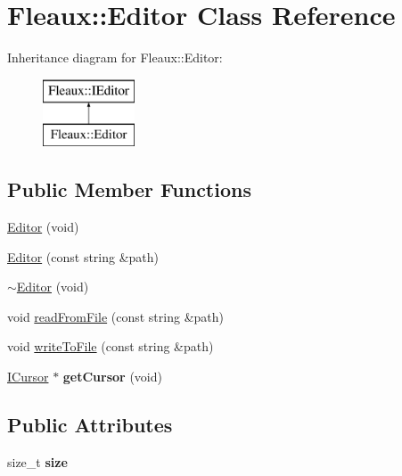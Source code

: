 \hypertarget{classFleaux_1_1Editor}{}\section{Fleaux\+:\+:Editor Class Reference}
\label{classFleaux_1_1Editor}
Inheritance diagram for Fleaux\+:\+:Editor\+:\begin{figure}[H]
\begin{center}
\leavevmode
\includegraphics[height=2.000000cm]{classFleaux_1_1Editor}
\end{center}
\end{figure}
\subsection*{Public Member Functions}
\begin{DoxyCompactItemize}
\item 
\hyperlink{classFleaux_1_1Editor_a5425124a3ddf55ad2fe2b668548c011f}{Editor} (void)
\item 
\hyperlink{classFleaux_1_1Editor_a023e2569b82e4299d02ddbd0a912fc5e}{Editor} (const string \&path)
\item 
\hyperlink{classFleaux_1_1Editor_a2be65be385e3a41d16c426c7bcdc00d9}{$\sim$\+Editor} (void)
\item 
void \hyperlink{classFleaux_1_1Editor_ac525cdc5632ff3cf1664a2088a4306e6}{read\+From\+File} (const string \&path)
\item 
void \hyperlink{classFleaux_1_1Editor_ad6f189d15112586cc5cefd37ab82e5f0}{write\+To\+File} (const string \&path)
\item 
\hypertarget{classFleaux_1_1Editor_a1b50a8618575889ef764404d1074940e}{}\hyperlink{classFleaux_1_1ICursor}{I\+Cursor} $\ast$ {\bfseries get\+Cursor} (void)\label{classFleaux_1_1Editor_a1b50a8618575889ef764404d1074940e}

\end{DoxyCompactItemize}
\subsection*{Public Attributes}
\begin{DoxyCompactItemize}
\item 
\hypertarget{classFleaux_1_1Editor_ab86c4d580c9e59bf5875c74064f2ff3c}{}size\+\_\+t {\bfseries size}\label{classFleaux_1_1Editor_ab86c4d580c9e59bf5875c74064f2ff3c}

\end{DoxyCompactItemize}
